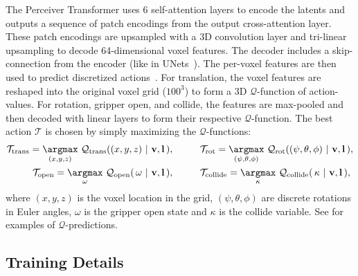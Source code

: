 The Perceiver Transformer uses 6 self-attention layers to encode the latents and outputs a sequence of patch encodings from the output cross-attention layer. These patch encodings are upsampled with a 3D convolution layer and tri-linear upsampling to decode 64-dimensional voxel features. The decoder includes a skip-connection from the encoder (like in UNets~\citep{ronneberger2015u}). The per-voxel features are then used to predict discretized actions~\citep{c2farm}. For translation, the voxel features are reshaped into the original voxel grid ($100^3$) to form a 3D $\mathcal{Q}$-function of action-values. For rotation, gripper open, and collide, the features are max-pooled and then decoded with linear layers to form their respective $\mathcal{Q}$-function. The best action $\mathcal{T}$ is chosen by simply maximizing the $\mathcal{Q}$-functions:
\begin{align*}
\mathcal{T}_{\textrm{trans}} = \underset{(x,y,z)}{\argmax} \  \mathcal{Q}_{\textrm{trans}}((x,y,z) \ | \ \mathbf{v}, \mathbf{l} \,), \hspace{1cm}  &
\mathcal{T}_{\textrm{rot}} = \underset{(\psi,\theta,\phi)}{\argmax} \  \mathcal{Q}_{\textrm{rot}}((\psi,\theta,\phi) \ | \ \mathbf{v}, \mathbf{l} \,), \\
\mathcal{T}_{\textrm{open}} = \underset{\omega}{\argmax} \  \mathcal{Q}_{\textrm{open}}(\, \omega \ | \ \mathbf{v}, \mathbf{l} \,), \hspace{1cm}  &
\mathcal{T}_{\textrm{collide}} = \underset{\kappa}{\argmax} \ \mathcal{Q}_{\textrm{collide}}(\, \kappa \ | \ \mathbf{v}, \mathbf{l} \,),
\end{align*}
where $(x, y, z)$ is the voxel location in the grid, $(\psi, \theta, \phi)$ are discrete rotations in Euler angles, $\omega$ is the gripper open state and $\kappa$ is the collide variable. See  for examples of  $\mathcal{Q}$-predictions.

\vspace{-0.1cm}
\subsection{Training Details}
\label{sec:training}
\vspace{-0.1cm}

